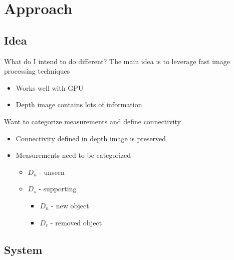 \documentclass{beamer}
\begin{document}
\section{Approach}

\subsection{Idea}

\begin{frame}{What do I intend to do different?}
The main idea is to leverage fast image processing techniques
\begin{itemize}
\item Works well with GPU
\item Depth image contains lots of information
\vspace{.1in} 
\end{itemize}
Want to categorize measurements and define connectivity 
\begin{itemize}
\item Connectivity defined in depth image is preserved 
\item Measurements need to be categorized
\begin{itemize}
\item $D_u$ - unseen
\item $D_s$ - supporting 
\begin{itemize}
\item $D_n$ - new object
\item $D_r$ - removed object
\end{itemize}
\end{itemize}
\end{itemize}
\end{frame}

\subsection{System}
\end{document}
